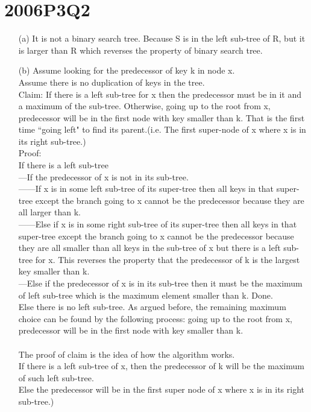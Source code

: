 \documentclass[10pt,twoside,a4paper]{article}
\begin{document}
\section{2006P3Q2}
\begin{itemize}
\item[(a)]
It is not a binary search tree. Because S is in the left sub-tree of R, but it is larger than R which reverses the property of binary search tree.
\item[(b)]
Assume looking for the predecessor of key k in node x.
\\Assume there is no duplication of keys in the tree.
\\Claim: If there is a left sub-tree for x then the predecessor must be in it and a maximum of the sub-tree. Otherwise, going up to the root from x, predecessor will be in the first node with key smaller than k. That is the first time ``going left" to find its parent.(i.e. The first super-node of x where x is in its right sub-tree.)
\\Proof:
\\If there is a left sub-tree
\\---If the predecessor of x is not in its sub-tree.
\\------If x is in some left sub-tree of its super-tree then all keys in that super-tree except the branch going to x cannot be the predecessor because they are all larger than k. 
\\------Else if x is in some right sub-tree of its super-tree then all keys in that super-tree except the branch going to x cannot be the predecessor because they are all smaller than all keys in the sub-tree of x but there is a left sub-tree for x. This reverses the property that the predecessor of k is the largest key smaller than k.
\\---Else if the predecessor of x is in its sub-tree then it must be the maximum of left sub-tree which is the maximum element smaller than k. Done.
\\Else there is no left sub-tree. As argued before, the remaining maximum choice can be found by the following process: going up to the root from x, predecessor will be in the first node with key smaller than k.
\\
\\The proof of claim is the idea of how the algorithm works. 
\\If there is a left sub-tree of x, then the predecessor of k will be the maximum of such left sub-tree.
\\Else the predecessor will be in the first super node of x where x is in its right sub-tree.)

\end{itemize}
\end{document}
